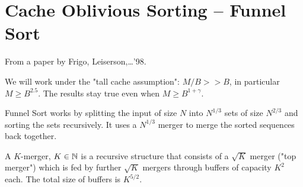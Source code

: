 \section{Cache Oblivious Sorting -- Funnel Sort}

From a paper by Frigo, Leiserson,\ldots '98.

We will work under the "tall cache assumption": $M/B>> B$, in particular $M\geq B^{2.5}$. The results stay true even when $M\geq B^{1+\gamma}$.

Funnel Sort works by splitting the input of size $N$ into $N^{1/3}$ sets of size $N^{2/3}$ and sorting the sets recursively. It uses a $N^{1/3}$ merger to merge the sorted sequences back together.

A $K$-merger, $K\in \mathbb{N}$ is a recursive structure that consists of a $\sqrt K$ merger ("top merger") which is fed by further $\sqrt{K}$ mergers through buffers of capacity $K^2$ each. The total size of buffers is $K^{5/2}$. 